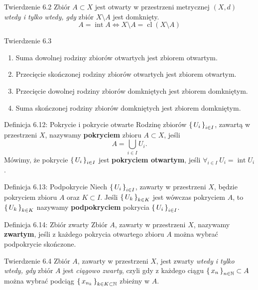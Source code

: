 \documentclass{article}
\newcommand{\N}{\mathbb{N}}
\DeclareMathOperator{\interior}{int}
\DeclareMathOperator{\Closure}{cl}
\newcommand{\seq}[1]{\set{#1_n}_{n\in\N}}
\newcommand{\ri}[1]{\set{#1_i}_{i\in I}}
\begin{document}
\begin{twier}{Twierdzenie 6.2}
    Zbiór $A\subset X$ jest otwarty w przestrzeni metrycznej $(X,d)$ \textit{wtedy i tylko wtedy, gdy} zbiór $X\setminus A$ jest domknięty.
    \begin{equation*}
        A=\interior{A}\iff X\setminus A=\Closure{\left(X\setminus A\right)}
    \end{equation*}
\end{twier}

\begin{twier}{Twierdzenie 6.3}
    \begin{enumerate}[label=(\arabic*)]
        \item Suma dowolnej rodziny zbiorów otwartych jest zbiorem otwartym.
        \item Przecięcie skończonej rodziny zbiorów otwartych jest zbiorem otwartym.
        \item Przecięcie dowolnej rodziny zbiorów domkniętych jest zbiorem domkniętym.
        \item Suma skończonej rodziny zbiorów domkniętych jest zbiorem domkniętym.
    \end{enumerate}
\end{twier}

\begin{defr}{Definicja 6.12: Pokrycie i pokrycie otwarte}
    Rodzinę zbiorów $\ri{U}$, zawartą w przestrzeni $X$, nazywamy \textbf{pokryciem} zbioru $A\subset X$, jeśli
    \begin{equation*}
        A=\bigcup_{i\in I}{U_i}.
    \end{equation*}
    Mówimy, że pokrycie $\ri{U}$ jest \textbf{pokryciem otwartym}, jeśli $\forall_{i\in I}\ U_i=\interior{U_i}$.
\end{defr}

\begin{defr}{Definicja 6.13: Podpokrycie}
    Niech $\ri{U}$, zawarty w przestrzeni $X$, będzie pokryciem zbioru $A$ oraz $K\subset I$. Jeśli $\set{U_k}_{k\in K}$
    jest wówczas pokryciem $A$, to $\set{U_k}_{k\in K}$ nazywamy \textbf{podpokryciem} pokrycia $\ri{U}$.
\end{defr}

\begin{defr}{Definicja 6.14: Zbiór zwarty}
    Zbiór $A$, zawarty w przestrzeni $X$, nazywamy \textbf{zwartym}, jeśli z każdego pokrycia otwartego zbioru $A$ można
    wybrać podpokrycie skończone.
\end{defr}

\begin{twier}{Twierdzenie 6.4}
    Zbiór $A$, zawarty w przestrzeni $X$, jest zwarty \textit{wtedy i tylko wtedy, gdy} zbiór $A$ jest \textit{ciągowo zwarty}, czyli
    gdy z każdego ciągu $\seq{x}\subset A$ można wybrać podciąg $\set{x_{n_k}}_{k\in K\subset\N}$ zbieżny w $A$.
\end{twier}
\end{document}

